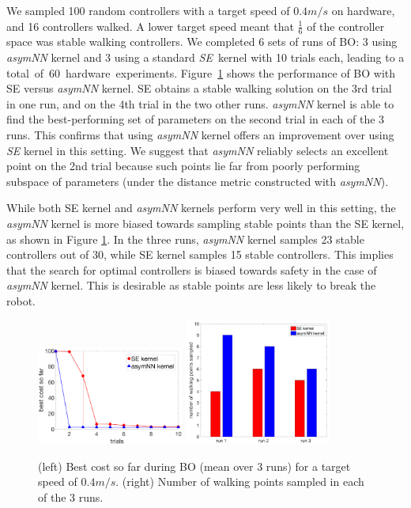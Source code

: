 We sampled 100 random controllers with a target speed of $0.4m/s$ on hardware, and 16 controllers walked. A lower target speed meant that $\frac{1}{6}$ of the controller space was stable walking controllers. We completed 6 sets of runs of BO: 3 using \textit{asymNN} kernel and 3 using a standard \mbox{\textit{SE} kernel} with 10 trials each, leading to a \mbox{total of 60 hardware experiments}. Figure~\ref{fig:bo_runs_plot_atrias_hw} shows the performance of BO with SE versus \textit{asymNN} kernel. SE obtains a stable walking solution on the 3rd trial in one run, and on the 4th trial in the two other runs. \textit{asymNN} kernel is able to find the best-performing set of parameters on the second trial in each of the 3 runs. This confirms that using \textit{asymNN} kernel offers an improvement over using \textit{SE} kernel in this setting. We suggest that \textit{asymNN} reliably selects an excellent point on the 2nd trial  because such points lie far from  poorly performing subspace of parameters (under the distance metric constructed with \textit{asymNN}). 

While both SE kernel and \textit{asymNN} kernels perform very well in this setting, the \textit{asymNN} kernel is more biased towards sampling stable points than the SE kernel, as shown in Figure \ref{fig:bo_runs_plot_atrias_hw}. In the three runs, \textit{asymNN} kernel samples 23 stable controllers out of 30, while SE kernel samples 15 stable controllers. This implies that the search for optimal controllers is biased towards safety in the case of \textit{asymNN} kernel. This is desirable as stable points are less likely to break the robot.

\begin{figure}[t]
\centering
\includegraphics[width=0.43\textwidth]{img/hdw_runs.png}
\hspace{0.15cm}
\includegraphics[width=0.43\textwidth]{img/walking_pts_sampled}
\caption{\small{(left) Best cost so far during BO (mean over 3 runs) for a target speed of $0.4m/s$. (right) Number of walking points sampled in each of the 3 runs.}}
\label{fig:bo_runs_plot_atrias_hw}
\end{figure}

